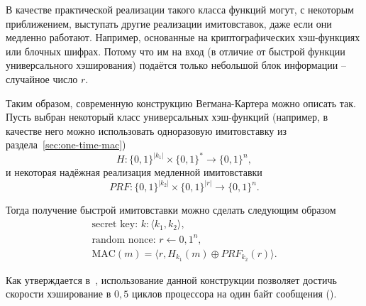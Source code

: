 В качестве практической реализации такого класса функций могут, с некоторым приближением, выступать другие реализации имитовставок, даже если они медленно работают. Например, основанные на криптографических хэш-функциях или блочных шифрах. Потому что им на вход (в отличие от быстрой функции универсального хэширования) подаётся только небольшой блок информации -- случайное число $r$.

Таким образом, современную конструкцию Вегмана-Картера можно описать так. Пусть выбран некоторый класс универсальных хэш-функций (например, в качестве него можно использовать одноразовую имитовставку из раздела~\ref{sec:one-time-mac}) \[
    H: \{0,1\}^{|k_1|} \times \{0,1\}^* \to \{0,1\}^n,
\] и некоторая надёжная реализация медленной имитовставки \[
    PRF: \{0,1\}^{|k_2|} \times \{0,1\}^{|r|} \to \{0,1\}^n.
\]

Тогда получение быстрой имитовставки можно сделать следующим образом
\[ \begin{array}{l}
\textrm{secret key: } k: \langle k_1, k_2 \rangle,\\
\textrm{random nonce: } r \leftarrow {0,1}^n,\\
\textrm{MAC} (m) = \langle r, H_{k_1}(m) \oplus PRF_{k_2}(r) \rangle.
\end{array} \]

Как утверждается в~\cite{Krovetz:2000}, использование данной конструкции позволяет достичь скорости хэширование в $0{,}5$ циклов процессора на один байт сообщения ().
